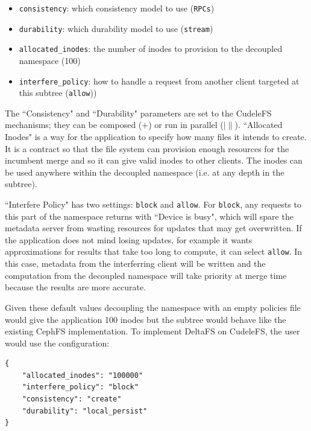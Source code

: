 \begin{itemize}

  \item \texttt{consistency}: which consistency model to use (\texttt{RPCs})

  \item \texttt{durability}: which durability model to use (\texttt{stream})

  \item \texttt{allocated\_inodes}: the number of inodes to provision to the
  decoupled namespace (100)

  \item \texttt{interfere\_policy}: how to handle a request from another
  client targeted at this subtree (\texttt{allow}))

\end{itemize}

The ``Consistency" and ``Durability" parameters are set to the CudeleFS
mechanisms; they can be composed (\(+\)) or run in parallel (\(|\|\)).
``Allocated Inodes" is a way for the application to specify how many files it
intends to create. It is a contract so that the file system can provision
enough resources for the incumbent merge and so it can give valid inodes to
other clients. The inodes can be used anywhere within the decoupled namespace
({i.e.} at any depth in the subtree).

``Interfere Policy" has two settings: \texttt{block} and \texttt{allow}.
For \texttt{block}, any requests to this part of the namespace returns with
``Device is busy", which will spare the metadata server from wasting resources
for updates that may get overwritten. If the application does not mind losing
updates, for example it wants approximations for results that take too long to
compute, it can select \texttt{allow}. In this case, metadata from the interferring client will be
written and the computation from the decoupled namespace will take priority at
merge time because the results are more accurate.

Given these default values decoupling the namespace with an empty policies file
would give the application 100 inodes but the subtree would behave like the
existing CephFS implementation. To implement DeltaFS on CudeleFS, the user
would use the configuration:

\begin{listing}[h]
\begin{verbatim}
{     
    "allocated_inodes": "100000"
    "interfere_policy": "block"
    "consistency": "create"
    "durability": "local_persist"
}
\end{verbatim}
\end{listing}

